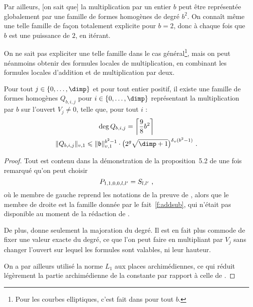 Par ailleurs, [on sait que] la multiplication par un
entier $b$ peut être
représentée globalement par une famille de formes homogènes de degré $b^2$. On
connaît même \cite[prop. 3.8]{daphimhva2} une telle famille de façon
totalement explicite pour $b = 2$, donc à chaque fois que $b$ est une
puissance de $2$, en itérant.

On ne sait  pas expliciter une telle famille dans le cas
général\footnote{
  Pour les courbes elliptiques, c'est fait dans \cite[th. 2.13.2]{farhith}
  pour tout $b$.},
mais on peut néanmoins obtenir des formules locales de multiplication, en
combinant les formules locales d'addition et de multiplication par deux.

\begin{fact}\label{f:mult-form}
  Pour tout $j \in \{ 0, \dots, \dimp \}$ et pour tout entier positif, il
  existe une famille de formes homogènes $Q_{b, i, j}$ pour $i \in \{ 0,
    \dots, \dimp \}$ représentant la multiplication par $b$ sur l'ouvert $V_j
  \neq 0$, telle que, pour tout $i$ :
  \begin{gather}
    \deg Q_{b, i, j} = \left\lceil \frac98 b^2 \right\rceil
    \\
    \norm {Q_{b, i, j}}_{v, 1}
    \le
    \norm{\coi}_{v, 1}^{b^2 -1}
    \cdot \bigl( 2^\genre \sqrt{\dimp+1} \bigr)^{\dv(b^2-1)}
    \pmm.
  \end{gather}
\end{fact}

\begin{proof} \later
  Tout est contenu dans la démonstration de la proposition~5.2 de \cite[pp.
  126-128]{remivds} une fois remarqué qu'on peut choisir
  \begin{equation}
    P_{1, 1, 0, 0, l, l'} = S_{l, l'}
    \text{ ,}
  \end{equation}
  où le membre de gauche reprend les notations de la preuve de ,
  alors que le membre de droite est la famille donnée par le
  fait~\ref{f:addsub}, qui n'était pas disponible au moment de la
  rédaction de \cite{remivds}.

  De plus,  donne seulement la majoration du degré. Il est en
  fait plus commode de fixer une valeur exacte du degré, ce que l'on peut
  faire en multipliant par $V_j$ sans changer l'ouvert sur lequel les
  formules sont valables, ni leur hauteur.

  On a par ailleurs utilisé la norme $L_1$ aux places archimédiennes, ce qui
  réduit légèrement la partie archimédienne de la constante par rapport à
  celle de .
\end{proof}

